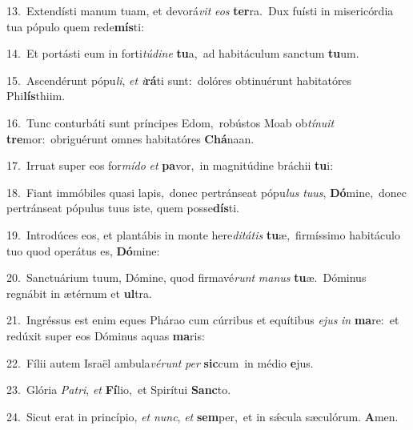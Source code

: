 {\numbfont\textcolor{\numbcolor}{13.}}~Extendísti manum tuam, et devorá\textit{vit} \textit{e}\-\textit{os} \textbf{ter}\-ra.~\star Dux fuísti in misericórdia tua pópulo quem rede\-\textbf{mís}\-ti:\par
{\numbfont\textcolor{\numbcolor}{14.}}~Et portásti eum in forti\-\textit{tú}\-\textit{di}\textit{ne} \textbf{tu}\-a,~\star ad habitáculum sanctum \textbf{tu}\-um.\par
{\numbfont\textcolor{\numbcolor}{15.}}~Ascendérunt pópu\-\textit{li}\-, \textit{et} \textit{i}\-\textbf{rá}ti sunt:~\star dolóres obtinuérunt habitatóres Phi\-\textbf{lís}\-thiim.\par
{\numbfont\textcolor{\numbcolor}{16.}}~Tunc conturbáti sunt príncipes Edom,~\dagger robústos Moab ob\-\textit{tí}\-\textit{nu}\textit{it} \textbf{tre}\-mor:~\star obriguérunt omnes habitatóres \textbf{Chá}\-naan.\par
{\numbfont\textcolor{\numbcolor}{17.}}~Irruat super eos for\-\textit{mí}\-\textit{do} \textit{et} \textbf{pa}\-vor,~\star in magnitúdine bráchii \textbf{tu}\-i:\par
{\numbfont\textcolor{\numbcolor}{18.}}~Fiant immóbiles quasi lapis,~\dagger donec pertránseat pópu\textit{lus} \textit{tu}\-\textit{us}, \textbf{Dó}\-mine,~\star donec pertránseat pópulus tuus iste, quem posse\-\textbf{dís}\-ti.\par
{\numbfont\textcolor{\numbcolor}{19.}}~Introdúces eos, et plantábis in monte here\-\textit{di}\-\textit{tá}\textit{tis} \textbf{tu}\-æ,~\star firmíssimo habitáculo tuo quod operátus es, \textbf{Dó}\-mine:\par
{\numbfont\textcolor{\numbcolor}{20.}}~Sanctuárium tuum, Dómine, quod firmavé\textit{runt} \textit{ma}\-\textit{nus} \textbf{tu}\-æ.~\star Dóminus regnábit in ætérnum et \textbf{ul}\-tra.\par
{\numbfont\textcolor{\numbcolor}{21.}}~Ingréssus est enim eques Phárao cum cúrribus et equítibus \textit{e}\-\textit{jus} \textit{in} \textbf{ma}\-re:~\star et redúxit super eos Dóminus aquas \textbf{ma}\-ris:\par
{\numbfont\textcolor{\numbcolor}{22.}}~Fílii autem Israël ambula\-\textit{vé}\-\textit{runt} \textit{per} \textbf{sic}\-cum~\star in médio \textbf{e}\-jus.\par
{\numbfont\textcolor{\numbcolor}{23.}}~Glória \textit{Pa}\-\textit{tri}, \textit{et} \textbf{Fí}\-lio,~\star et Spirítui \textbf{Sanc}\-to.\par
{\numbfont\textcolor{\numbcolor}{24.}}~Sicut erat in princípio, \textit{et} \textit{nunc}\-, \textit{et} \textbf{sem}\-per,~\star et in sǽcula sæculórum. \textbf{A}\-men.\par
